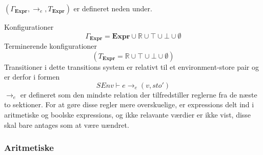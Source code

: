 $(\Gamma_\textbf{Expr},\to_e,T_\textbf{Expr})$ er defineret neden under.

Konfigurationer
\[
    \Gamma_\textbf{Expr} = \textbf{Expr} \cup \mathbb{R} \cup \top \cup \bot \cup \emptyset 
\]
Terminerende konfigurationer
\[
    (T_\textbf{Expr}=\mathbb{R}\cup\top\cup\bot\cup \emptyset)
\]
Transitioner i dette transitions system er relativt til et environment-store pair og er derfor i formen
\[
    SEnv \vdash e \to_e (v, sto')
\]
$\to_e$ er defineret som den mindste relation der tilfredstiller reglerne fra de næste to sektioner. For at gøre disse regler mere overskuelige, er expressions delt ind i aritmetiske og boolske expressions, og ikke relavante værdier er ikke vist, disse skal bare antages som at være uændret.\\

\noindent \subsubsection{Aritmetiske}
\label{ssec:aexpr}

